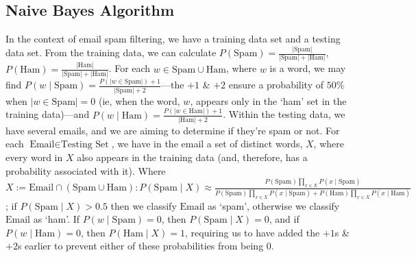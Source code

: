 
\subsection{Naive Bayes Algorithm}\label{sub_sec:naive_bayes_algorithm}

In the context of email spam filtering, we have a training data set and a testing data set. From the training data, we can calculate $P(\text{Spam}) = \frac{|\text{Spam}|}{|\text{Spam}| + |\text{Ham}|}$, $P(\text{Ham}) = \frac{|\text{Ham}|}{|\text{Spam}| + |\text{Ham}|}$. For each $w \in \text{Spam} \cup \text{Ham}$, where $w$ is a word, we may find $P(w \mid \text{Spam}) = \frac{P(|w \in \text{Spam}|) + 1}{|\text{Spam}| + 2}$---the $+1$ \& $+2$ ensure a probability of $50\%$ when $|w \in \text{Spam}| = 0$ (ie, when the word, $w$, appears only in the `ham' set in the training data)---and $P(w \mid \text{Ham}) = \frac{P(|w \in \text{Ham}|) + 1}{|\text{Ham}| + 2}$. Within the testing data, we have several emails, and we are aiming to determine if they're spam or not. For each $\text{Email} \in \text{Testing Set}$, we have in the email a set of distinct words, $X$, where every word in $X$ also appears in the training data (and, therefore, has a probability associated with it). Where $X := \text{Email} \cap (\text{Spam} \cup \text{Ham}): P(\text{Spam} \mid X) \approx \frac{P(\text{Spam}) \underset{x \in X}{\prod} P(x \mid \text{Spam})}{P(\text{Spam}) \underset{x \in X}{\prod} P(x \mid \text{Spam}) + P(\text{Ham}) \underset{x \in X}{\prod} P(x \mid \text{Ham})}$; if $P(\text{Spam} \mid X) > 0.5$ then we classify $\text{Email}$ as `spam', otherwise we classify $\text{Email}$ as `ham'. If $P(w \mid \text{Spam}) = 0$, then $P(\text{Spam} \mid X) = 0$, and if $P(w \mid \text{Ham}) = 0$, then $P(\text{Ham} \mid X) = 1$, requiring us to have added the $+1$s \& $+2$s earlier to prevent either of these probabilities from being $0$.


